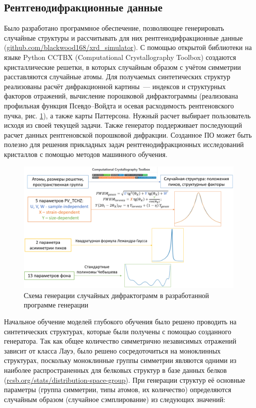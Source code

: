 \subsection{Рентгенодифракционные данные}

Было разработано программное обеспечение, позволяющее генерировать случайные структуры и рассчитывать для них рентгенодифракционные данные (\url{github.com/blackwood168/xrd_simulator}). С помощью открытой библиотеки на языке Python CCTBX (Computational Crystallography Toolbox) \cite{grosse-kunstleve_computational_2002} создаются кристаллические решетки, в которых случайным образом с учётом симметрии расставляются случайные атомы. Для получаемых синтетических структур реализованы расчёт дифракционной картины~--- индексов и структурных факторов отражений, вычисление порошковой дифрактограммы (реализована профильная функция Псевдо--Войдта \cite{david_powder_1986} и осевая расходимость рентгеновского пучка, рис. \ref{pxrd}), а также карты Паттерсона. Нужный расчет выбирает пользователь исходя из своей текущей задачи.   Также генератор поддерживает последующий расчет данных рентгеновской порошковой дифракции. Созданное ПО может быть полезно для решения прикладных задач рентгенодифракционных исследований кристаллов с помощью методов машинного обучения. 


\begin{figure}[H]
	\centering
	\includegraphics[width=1\textwidth]{figures/pxrd.png}\hfill
	\caption{Схема генерации случайных дифрактограмм в разработанной программе генерации}
	\label{pxrd}
\end{figure}

Начальное обучение моделей глубокого обучения было решено проводить на синтетических структурах, которые были получены с помощью созданного генератора. Так как общее количество симметрично независимых отражений зависит от класса Лауэ, было решено сосредоточиться на моноклинных структурах, поскольку моноклинные группы симметрии являются одними из наиболее распространенных для белковых структур в базе данных белков (\url{rcsb.org/stats/distribution-space-group}). При генерации структур её основные параметры (группа симметрии, типы атомов, их количество) определяются случайным образом (случайное сэмплирование) из следующих значений: 

